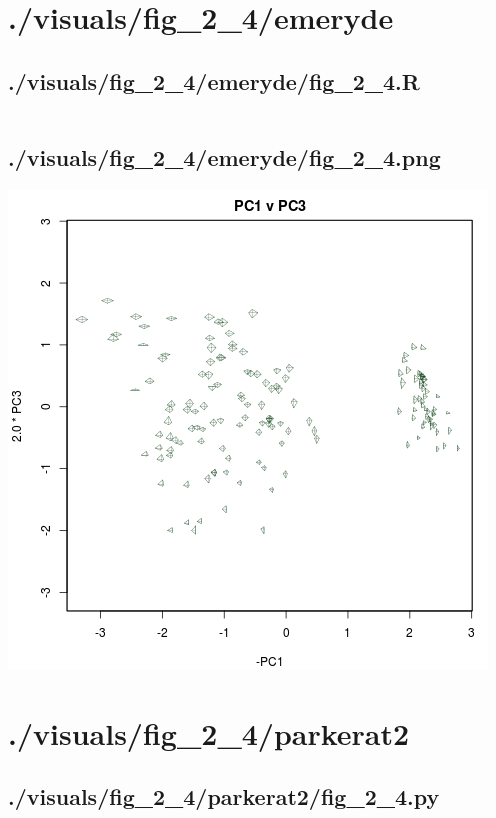 \documentclass{report}
\begin{document}
    \section{./visuals/fig\_2\_4/emeryde}
    \subsection{./visuals/fig\_2\_4/emeryde/fig\_2\_4.R}
    \inputminted[breaklines=true]{r}{.././visuals/fig_2_4/emeryde/fig_2_4.R}
    \subsection{./visuals/fig\_2\_4/emeryde/fig\_2\_4.png}
    \includegraphics[width=\textwidth]{.././visuals/fig_2_4/emeryde/fig_2_4.png}
    \pagebreak
    \section{./visuals/fig\_2\_4/parkerat2}
    \subsection{./visuals/fig\_2\_4/parkerat2/fig\_2\_4.py}
    \inputminted[breaklines=true]{python}{.././visuals/fig_2_4/parkerat2/fig_2_4.py}
\end{document}
